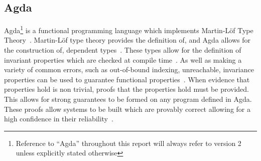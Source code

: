 %






\subsection{Agda}
Agda\footnote{Reference to ``Agda'' throughout this report will always refer to 
version 2 unless explicitly stated otherwise} is a functional programming 
language which implements Martin-Löf Type Theory~\cite{Norell2007}\cite{Martin-Lf1984}.
Martin-Löf type theory provides the definition of, and Agda allows for the 
construction of, dependent types~\cite{Norell2007}.
These types allow for the definition of invariant properties which are checked
at compile time~\cite{Norell2007}.
As well as making a variety of common errors, such as out-of-bound indexing,
unreachable, invariance properties can be used to guarantee functional
properties~\cite{Norell2007}.
When evidence that properties hold is non trivial, proofs that the properties
hold must be provided.
This allows for strong guarantees to be formed on any program defined in Agda.
These proofs allow systems to be built which are provably correct allowing for a high confidence in their reliability~\cite{Norell2007}.

